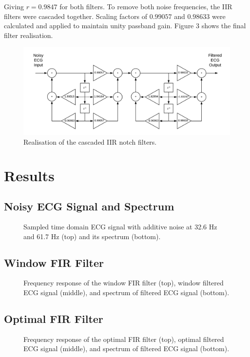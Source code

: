 \documentclass[12pt]{article}
\begin{document}
\noindent Giving $r = 0.9847$ for both filters. To remove both noise frequencies, the IIR filters were cascaded together. Scaling factors of $0.99057$ and $0.98633$ were calculated and applied to
maintain unity passband gain. Figure 3 shows the final filter realisation.

\begin{figure}[H]
    \centering
    \includegraphics[width=\textwidth]{iir-block.png}
    \caption{Realisation of the cascaded IIR notch filters.}
    \label{fig:iir-filt}
\end{figure}
\section{Results}

\subsection{Noisy ECG Signal and Spectrum}
\begin{figure}[H]
    \centering
    \caption{Sampled time domain ECG signal with additive noise at 32.6 Hz and 61.7 Hz (top) and its spectrum (bottom).}
    \label{fig:noisy}
\end{figure}

\subsection{Window FIR Filter}
\begin{figure}[H]
    \centering
    \caption{Frequency response of the window FIR filter (top), window filtered ECG signal (middle), and spectrum of filtered ECG signal (bottom).}
    \label{fig:fir-window}
\end{figure}

\subsection{Optimal FIR Filter}
\begin{figure}[H]
    \centering
    \caption{Frequency response of the optimal FIR filter (top), optimal filtered ECG signal (middle), and spectrum of filtered ECG signal (bottom).}
    \label{fig:fir-optimal}
\end{figure}
\end{document}
